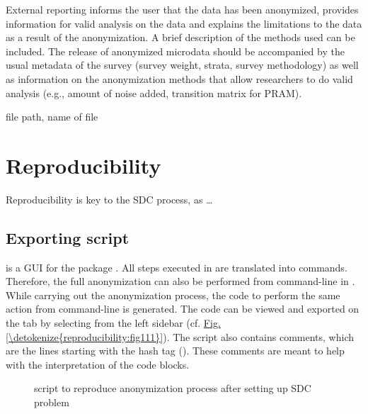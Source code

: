 \documentclass[letterpaper,10pt,english]{sphinxmanual}
\begin{document}
External reporting informs the user that the data has been anonymized,
provides information for valid analysis on the data and explains the limitations to
the data as a result of the anonymization. A brief description of the methods used
can be included. The release of anonymized microdata should be accompanied by the
usual metadata of the survey (survey weight, strata, survey methodology) as well as
information on the anonymization methods that allow researchers to do valid analysis
(e.g., amount of noise added, transition matrix for PRAM).

file path, name of file


\chapter{Reproducibility}
\label{\detokenize{reproducibility::doc}}\label{\detokenize{reproducibility:reproducibility}}
Reproducibility is key to the SDC process, as …


\section{Exporting  script}
\label{\detokenize{reproducibility:exporting-r-script}}
 is a GUI for the  package . All steps executed in  are translated
into  commands. Therefore, the full anonymization can also be performed from command-line
in . While carrying out the anonymization process, the code to perform the same action
from command-line is generated. The code can be viewed and exported on the 
tab by selecting  from the left sidebar (cf. \hyperref[\detokenize{reproducibility:fig111}]{Fig.\@ \ref{\detokenize{reproducibility:fig111}}}).
The script also contains comments, which are the lines starting with the hash tag (\sphinxcode{\sphinxupquote{\#}}).
These comments are meant to help with the interpretation of the code blocks.

\begin{figure}[htbp]
\centering
\capstart

\noindent{}
\caption{ script to reproduce anonymization process after setting up SDC problem}\label{\detokenize{reproducibility:fig111}}\label{\detokenize{reproducibility:id5}}\end{figure}
\end{document}
